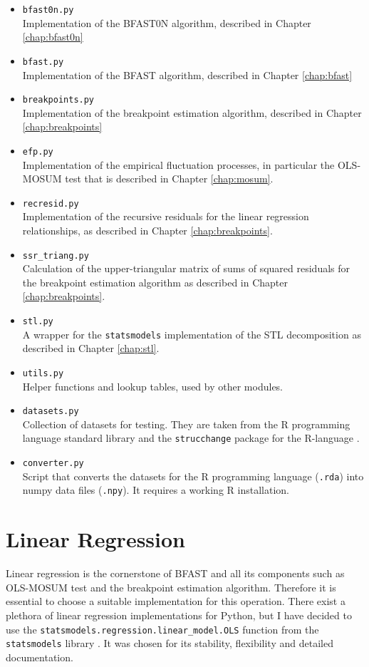 \documentclass[main.tex]{subfiles}
\begin{document}
\begin{itemize}
\item \texttt{bfast0n.py}\\
  Implementation of the BFAST0N algorithm, described in Chapter \ref{chap:bfast0n}
\item \texttt{bfast.py}\\
  Implementation of the BFAST algorithm, described in Chapter \ref{chap:bfast}
\item \texttt{breakpoints.py}\\
  Implementation of the breakpoint estimation algorithm, described in Chapter \ref{chap:breakpoints}
\item \texttt{efp.py}\\
  Implementation of the empirical fluctuation processes, in particular the OLS-MOSUM test that is
  described in Chapter \ref{chap:mosum}.
\item \texttt{recresid.py}\\
  Implementation of the recursive residuals for the linear regression relationships,
  as described in Chapter \ref{chap:breakpoints}.
\item \texttt{ssr\_triang.py}\\
  Calculation of the upper-triangular matrix of sums of squared residuals for
  the breakpoint estimation algorithm as described in Chapter \ref{chap:breakpoints}.
\item \texttt{stl.py} \\
  A wrapper for the \texttt{statsmodels} \cite{statsmodels} implementation of the STL decomposition as
  described in Chapter \ref{chap:stl}.
\item \texttt{utils.py} \\
  Helper functions and lookup tables, used by other modules. 
\item \texttt{datasets.py}\\
  Collection of datasets for testing. They are taken from the R programming language standard library
  \cite{r-datasets} and
  the \texttt{strucchange} package for the R-language \cite{strucchange_code}.
\item \texttt{converter.py}\\
  Script that converts the datasets for the R programming language (\texttt{.rda}) into numpy
  data files (\texttt{.npy}). It requires a working R installation.
\end{itemize}

\section{Linear Regression}
\label{sec:linear_regression}
Linear regression is the cornerstone of BFAST and all its components such as
OLS-MOSUM test and the breakpoint estimation algorithm. Therefore it is
essential to choose a suitable implementation for this operation. There exist a
plethora of linear regression implementations for Python, but I have decided to
use the \texttt{statsmodels.regression.linear\_model.OLS} function from the
\texttt{statsmodels} library \cite{statsmodels}. It was chosen for its
stability, flexibility and detailed documentation.
\end{document}
